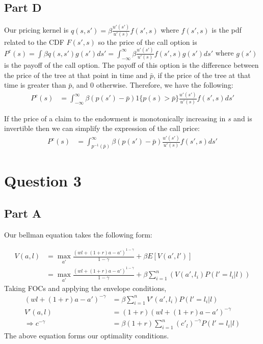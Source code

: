 \documentclass[11pt]{article} %
\begin{document}
\subsection{Part D}
Our pricing kernel is $q(s,s') = \beta \frac{u'(s')}{u'(s)} f(s',s)$ where $f(s',s) $ is the pdf related to the CDF $F(s',s)$ so the price of the call option is $P^c(s) = \int \beta q(s,s') g(s')ds' = \int_{-\infty}^{\infty}\beta \frac{u'(s')}{u'(s)} f(s',s)g(s')ds'$ where $g(s')$ is the payoff of the call option. The payoff of this option is the difference between the price of the tree at that point in time and $\bar{p}$, if the price of the tree at that time is greater than $\bar{p}$, and $0$ otherwise. Therefore, we have the following:
\begin{align*}
P^c(s) &= \int_{-\infty}^{\infty}\beta ( p(s') - \bar{p})1\{ p(s)>\bar{p}\}\frac{u'(s')}{u'(s)} f(s',s)ds'
\end{align*}

If the price of a claim to the endowment is monotonically increasing in $s$ and is invertible then we can simplify the expression of the call price:
\begin{align*}
P^c(s) &= \int_{p^{-1}(\bar{p})}^{\infty}\beta ( p(s') - \bar{p})\frac{u'(s')}{u'(s)} f(s',s)ds'
\end{align*}
\section{Question 3}
\subsection{Part A}
Our bellman equation takes the following form:

\begin{align*}
V(a,l) &= \max_{a'} \frac{(wl +(1+r)a - a')^{1-\gamma}}{1-\gamma} + \beta E[V(a',l')]\\
&=  \max_{a'} \frac{(wl +(1+r)a - a')^{1-\gamma}}{1-\gamma} + \beta \sum_{i=1}^{n} (V(a',l_i)P(l'=l_i|l) )
\end{align*}
Taking FOCs and applying the envelope conditions,
\begin{align*}
(wl +(1+r)a - a')^{-\gamma} &= \beta \sum_{i=1}^{n} V'(a',l_i)P(l'=l_i|l)\\
V'(a,l) &= (1+r)(wl +(1+r)a - a')^{-\gamma}\\
\Rightarrow c^{-\gamma} &= \beta(1+r)\sum_{i=1}^{n} (c'_l)^{-\gamma}P(l'=l_i|l)  
\end{align*}
The above equation forms our optimality conditions.
\end{document}
